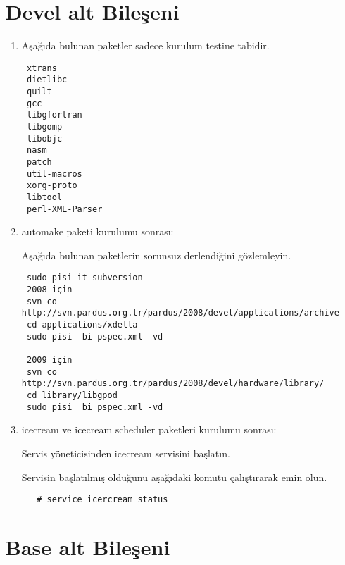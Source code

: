 \documentclass[a4paper,10pt]{article}
\begin{document}
\section{Devel alt Bileşeni}
\begin{enumerate}
 \item Aşağıda bulunan paketler sadece kurulum testine tabidir.
\begin{verbatim}
 xtrans
 dietlibc 
 quilt
 gcc
 libgfortran
 libgomp
 libobjc
 nasm
 patch
 util-macros
 xorg-proto
 libtool
 perl-XML-Parser
\end{verbatim}
\item automake paketi kurulumu sonrası:

Aşağıda bulunan paketlerin sorunsuz derlendiğini gözlemleyin.
\begin{verbatim}
 sudo pisi it subversion
 2008 için
 svn co http://svn.pardus.org.tr/pardus/2008/devel/applications/archive
 cd applications/xdelta
 sudo pisi  bi pspec.xml -vd

 2009 için
 svn co http://svn.pardus.org.tr/pardus/2008/devel/hardware/library/
 cd library/libgpod
 sudo pisi  bi pspec.xml -vd

\end{verbatim}

 \item icecream ve icecream scheduler paketleri kurulumu sonrası:

Servis yöneticisinden icecream servisini başlatın.

Servisin başlatılmış olduğunu aşağıdaki komutu çalıştırarak emin olun.
 \begin{verbatim}
   # service icercream status
 \end{verbatim}

\end{enumerate}


\section{Base alt Bileşeni}
\end{document}
